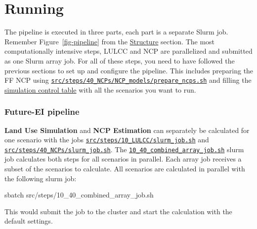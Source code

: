 \documentclass[
  letterpaper,
  DIV=11,
  numbers=noendperiod]{scrreprt}
\newenvironment{Shaded}{\begin{snugshade}}{\end{snugshade}}
\newcommand{\ExtensionTok}[1]{\textcolor[rgb]{0.00,0.23,0.31}{#1}}
\newcommand{\NormalTok}[1]{\textcolor[rgb]{0.00,0.23,0.31}{#1}}
\begin{document}
\chapter{Running}\label{running}

The pipeline is executed in three parts, each part is a separate Slurm
job. Remember Figure~\ref{fig-pipeline} from the
\href{../structure.html}{Structure} section. The most computationally
intensive steps, LULCC and NCP are parallelized and submitted as one
Slurm array job. For all of these steps, you need to have followed the
previous sections to set up and configure the pipeline. This includes
preparing the FF NCP using
\href{https://github.com/cbueth/Future-EI/tree/main/src/steps/40_NCPs/NCP_models/prepare_ncps.sh}{\texttt{src/steps/40\_NCPs/NCP\_models/prepare\_ncps.sh}}
and filling the \hyperref[simulation-control-table]{simulation control
table} with all the scenarios you want to run.

\subsection{Future-EI pipeline}\label{future-ei-pipeline}

\textbf{Land Use Simulation} and \textbf{NCP Estimation} can separately
be calculated for one scenario with the jobs
\href{https://github.com/cbueth/Future-EI/tree/main/src/steps/10_LULCC/slurm_job.sh}{\texttt{src/steps/10\_LULCC/slurm\_job.sh}}
and
\href{https://github.com/cbueth/Future-EI/tree/main/src/steps/40_NCPs/slurm_job.sh}{\texttt{src/steps/40\_NCPs/slurm\_job.sh}}.
The
\href{https://github.com/cbueth/Future-EI/tree/main/src/steps/10_40_combined_array_job.sh}{\texttt{10\_40\_combined\_array\_job.sh}}
slurm job calculates both steps for all scenarios in parallel. Each
array job receives a subset of the scenarios to calculate. All scenarios
are calculated in parallel with the following slurm job:

\begin{Shaded}
\begin{Highlighting}[]
\ExtensionTok{sbatch}\NormalTok{ src/steps/10\_40\_combined\_array\_job.sh}
\end{Highlighting}
\end{Shaded}

This would submit the job to the cluster and start the calculation with
the default settings.
\end{document}

